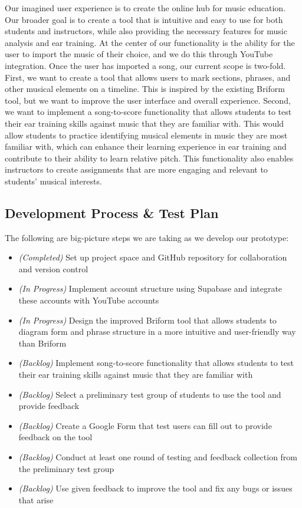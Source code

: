 \documentclass[12pt, letterpaper]{article}
\begin{document}
Our imagined user experience is to create the online hub for music education.  Our broader goal is to create a tool that is intuitive and easy to use for both students and instructors, while also providing the necessary features for music analysis and ear training.  At the center of our functionality is the ability for the user to import the music of their choice, and we do this through YouTube integration.  Once the user has imported a song, our current scope is two-fold.  First, we want to create a tool that allows users to mark sections, phrases, and other musical elements on a timeline.  This is inspired by the existing Briform tool, but we want to improve the user interface and overall experience.  Second, we want to implement a song-to-score functionality that allows students to test their ear training skills against music that they are familiar with.  This would allow students to practice identifying musical elements in music they are most familiar with, which can enhance their learning experience in ear training and contribute to their ability to learn relative pitch.  This functionality also enables instructors to create assignments that are more engaging and relevant to students' musical interests.

\subsection*{Development Process \& Test Plan}
The following are big-picture steps we are taking as we develop our prototype:
\begin{itemize}
	\item[] \textit{(Completed)} Set up project space and GitHub repository for collaboration and version control
	\item[] \textit{(In Progress)} Implement account structure using Supabase and integrate these accounts with YouTube accounts
	\item[] \textit{(In Progress)} Design the improved Briform tool that allows students to diagram form and phrase structure in a more intuitive and user-friendly way than Briform
	\item[] \textit{(Backlog)} Implement song-to-score functionality that allows students to test their ear training skills against music that they are familiar with
	\item[] \textit{(Backlog)} Select a preliminary test group of students to use the tool and provide feedback
	\item[] \textit{(Backlog)} Create a Google Form that test users can fill out to provide feedback on the tool
	\item[] \textit{(Backlog)} Conduct at least one round of testing and feedback collection from the preliminary test group
	\item[] \textit{(Backlog)} Use given feedback to improve the tool and fix any bugs or issues that arise
\end{itemize}
\end{document}
